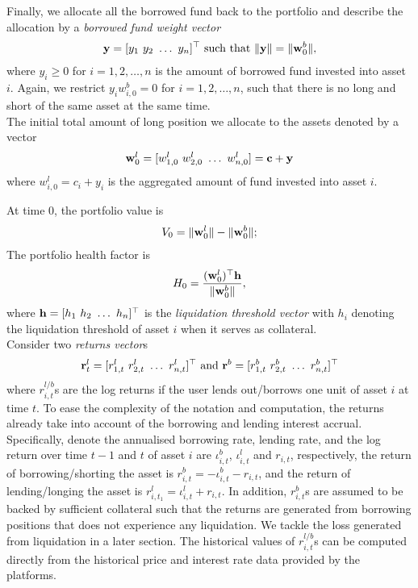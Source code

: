 \documentclass{article} %
\theoremstyle{plain}
\theoremstyle{definition} %
\begin{document}
Finally, we allocate all the borrowed fund back to the portfolio and describe the allocation by a \textit{borrowed fund weight vector}
\begin{align*}
  {\bf y} = [y_1\ y_2\ \dots\ y_n]^\top \text{ such that } \|{\bf y}\| = \|{\bf w}^b_0\|,
\end{align*}
where $y_i \geq 0$ for $i=1,2,\dots,n$ is the amount of borrowed fund invested into asset $i$.
Again, we restrict $y_iw^b_{i,0} = 0$ for $i=1,2,\dots,n$, such that there is no long and short of the same asset at the same time. \\

The initial total amount of long position we allocate to the assets denoted by a vector
\begin{align*}
  {\bf w}^l_0 =[w^l_{1,0}\ w^l_{2,0}\ \dots\ w^l_{n,0}] = {\bf c} + {\bf y}
  \end{align*}
where $w_{i,0}^l = c_i + y_i$ is the aggregated amount of fund invested into asset $i$.

At time $0$, the portfolio value is 
\begin{align*}
  V_0 = \|{\bf w}^l_0\| - \|{\bf w}^b_0\| ;
  \end{align*}
The portfolio health factor is 
\begin{align*}
H_0 = \frac{({\bf w}^l_0)^\top {\bf h} }{\|{\bf w}^b_0\|},
\end{align*}
where ${\bf h}=[h_1\ h_2\ \dots\ h_n]^\top$ is the \textit{liquidation threshold vector} with $h_i$ denoting the liquidation threshold of asset $i$ when it serves as collateral. \\

Consider two \textit{returns vector}s 
\begin{align*}
  {\bf{r}}^l_t = [r_{1,t}^l\ r_{2,t}^l\ \dots \ r^l_{n,t}]^\top \text{ and } {\bf{r}}^b = [r^b_{1,t}\ r^b_{2,t}\ \dots\ r^b_{n,t}]^\top
\end{align*}
where $r^{l/b}_{i,t}$s are the log returns if the user lends out/borrows one unit of asset $i$ at time $t$. 
To ease the complexity of the notation and computation, the returns already take into account of the borrowing and lending interest accrual. 
Specifically, denote the annualised borrowing rate, lending rate, and the log return over time $t-1$ and $t$ of asset $i$ are $\iota^b_{i,t}$, $\iota^l_{i, t}$ and $r_{i,t}$, respectively,
the return of borrowing/shorting the asset is $r^b_{i,t} =  -\iota^b_{i,t} - r_{i,t}$, and the return of lending/longing the asset is $r^l_{i,t_1} =  \iota^l_{i,t} + r_{i,t}$.
In addition, $r^{b}_{i,t}$s are assumed to be backed by sufficient collateral such that the returns are generated from borrowing positions that does not experience any liquidation.
We tackle the loss generated from liquidation in a later section. 
The historical values of $r^{l/b}_{i,t}$s can be computed directly from the historical price and interest rate data provided by the platforms.\\
\end{document}
